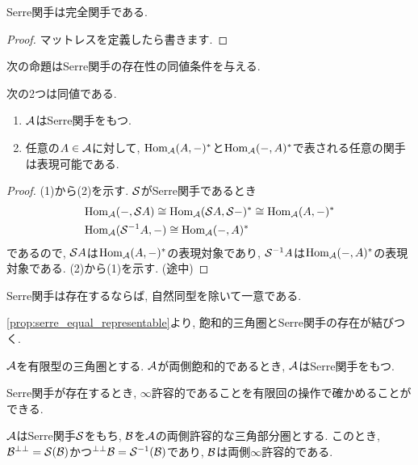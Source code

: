 \documentclass[uplatex, a4paper, 14Q, dvipdfmx]{jsarticle}
\begin{document}
\begin{theorem}
  Serre関手は完全関手である.
\end{theorem}

\begin{proof}
  マットレスを定義したら書きます.
\end{proof}

次の命題はSerre関手の存在性の同値条件を与える. 

\begin{theorem} \label{prop:serre_equal_representable}
  次の2つは同値である. 
  \begin{enumerate}
    \item $\A$はSerre関手をもつ. 
    \item 任意の$A \in \A$に対して, $\Hom_\A(A,-)^\ast$と$\Hom_\A(-,A)^\ast$で表される任意の関手は表現可能である. 
  \end{enumerate}
\end{theorem}

\begin{proof}
  (1)から(2)を示す.
  $\S$がSerre関手であるとき
  \begin{align*}
    & \Hom_\A(-,\S A) \cong \Hom_\A(\S A,\S -)^\ast \cong \Hom_\A(A,-)^\ast \\
    & \Hom_\A(\S^{-1}A,-) \cong \Hom_\A(-,A)^\ast
  \end{align*}
  であるので, $\S A$は$\Hom_\A(A,-)^\ast$の表現対象であり, $\S^{-1} A$は$\Hom_\A(-,A)^\ast$の表現対象である. 
  (2)から(1)を示す. (途中)

\end{proof}

\begin{theorem}
  Serre関手は存在するならば, 自然同型を除いて一意である. 
\end{theorem}

\cref{prop:serre_equal_representable}より, 飽和的三角圏とSerre関手の存在が結びつく. 

\begin{corollary}
  $\A$を有限型の三角圏とする. 
  $\A$が両側飽和的であるとき, $\A$はSerre関手をもつ. 
\end{corollary}

Serre関手が存在するとき, $\infty$許容的であることを有限回の操作で確かめることができる.

\begin{theorem}
  $\A$はSerre関手$\S$をもち, $\B$を$\A$の両側許容的な三角部分圏とする.
  このとき, $\Bpp = \S(\B)$かつ$\ppB = \S^{-1}(\B)$であり, $\B$は両側$\infty$許容的である. 
\end{theorem}
\end{document}
